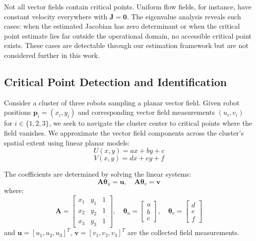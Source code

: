 \documentclass[lettersize,journal]{IEEEtran}
\begin{document}
Not all vector fields contain critical points. Uniform flow fields, for instance, have constant velocity everywhere with $\mathbf{J} = \mathbf{0}$. The eigenvalue analysis reveals such cases: when the estimated Jacobian has zero determinant or when the critical point estimate lies far outside the operational domain, no accessible critical point exists. These cases are detectable through our estimation framework but are not considered further in this work.
    

\subsection{Critical Point Detection and Identification}
\noindent
Consider a cluster of three robots sampling a planar vector field. Given robot positions $\mathbf{p}_i = (x_i, y_i)$ and corresponding vector field measurements $(u_i, v_i)$ for $i \in \{1, 2, 3\}$, we seek to navigate the cluster center to critical points where the field vanishes.
We approximate the vector field components across the cluster's spatial extent using linear planar models:
\begin{equation}
U(x,y) = ax + by + c
\end{equation}
\begin{equation}
V(x,y) = dx + ey + f
\end{equation}

The coefficients are determined by solving the linear systems:
\begin{equation}
\mathbf{A}\boldsymbol{\theta}_u = \mathbf{u}, \quad \mathbf{A}\boldsymbol{\theta}_v = \mathbf{v}
\end{equation}
where:
\begin{equation}
\mathbf{A} = \begin{bmatrix} x_1 & y_1 & 1 \\ x_2 & y_2 & 1 \\ x_3 & y_3 & 1 \end{bmatrix}, \quad \boldsymbol{\theta}_u = \begin{bmatrix} a \\ b \\ c \end{bmatrix}, \quad \boldsymbol{\theta}_v = \begin{bmatrix} d \\ e \\ f \end{bmatrix}
\end{equation}
and $\mathbf{u} = [u_1, u_2, u_3]^T$, $\mathbf{v} = [v_1, v_2, v_3]^T$ are the collected field measurements.
\end{document}

